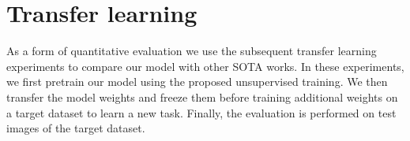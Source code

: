 \documentclass[a4paper,12pt]{report}
\begin{document}




\section{Transfer learning} %
As a form of quantitative evaluation we use the subsequent transfer learning experiments to compare our model with other SOTA works. In these experiments, we first pretrain our model using the proposed unsupervised training. We then transfer the model weights and freeze them before training additional weights on a target dataset to learn a new task. Finally, the evaluation is performed on test images of the target dataset.
\end{document}
